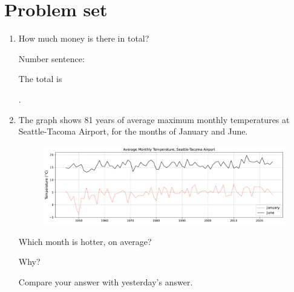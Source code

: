 \documentclass{tufte-book}
\begin{document}
\clearpage\section{Problem set }

\begin{enumerate}

\item {}
How much money is there in total?\medskip

Number sentence: \dotfill\medskip

The total is \dotfill\medskip\par\mbox{}\dotfill\medskip.\par

\item The graph shows 81 years of average maximum monthly temperatures at Seattle-Tacoma Airport, for the months of January and June.
\begin{figure}[h]\includegraphics[width=1.5\textwidth]{fig/line_monthly_temp_sea.pdf}\end{figure}

Which month is hotter, on average?\medskip\dotfill\par
Why? \dotfill\medskip\par\mbox{}\dotfill\medskip\par\mbox{}\dotfill\bigskip\par
Compare your answer with yesterday's answer. \dotfill\medskip\par\mbox{}\dotfill\medskip\par\mbox{}\dotfill\bigskip



\end{enumerate}
\end{document}
